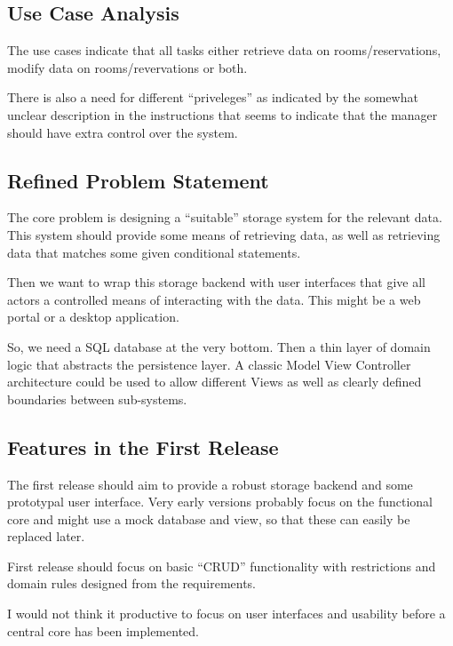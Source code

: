 \subsection{Use Case Analysis}
%
%
The use cases indicate that all tasks either retrieve data on
rooms/reservations, modify data on rooms/revervations or both.

There is also a need for different ``priveleges'' as indicated by the somewhat
unclear description in the instructions that seems to indicate that the manager
should have extra control over the system.



\subsection{Refined Problem Statement}
%
%
The core problem is designing a ``suitable'' storage system for the relevant
data. This system should provide some means of retrieving data, as well as
retrieving data that matches some given conditional statements.

Then we want to wrap this storage backend with user interfaces that give all
actors a controlled means of interacting with the data.
This might be a web portal or a desktop application.


So, we need a SQL database at the very bottom. Then a thin layer of domain
logic that abstracts the persistence layer. A classic Model View Controller
architecture could be used to allow different Views as well as clearly defined
boundaries between sub-systems.

\subsection{Features in the First Release}

The first release should aim to provide a robust storage backend and some
prototypal user interface. Very early versions probably focus on the functional
core and might use a mock database and view, so that these can easily be
replaced later.

First release should focus on basic ``CRUD'' functionality with restrictions
and domain rules designed from the requirements.

I would not think it productive to focus on user interfaces and usability
before a central core has been implemented.
